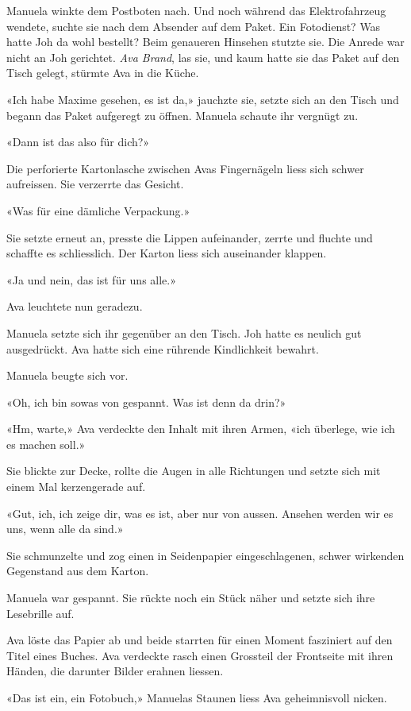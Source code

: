 Manuela winkte dem Postboten nach. Und noch während das Elektrofahrzeug
wendete, suchte sie nach dem Absender auf dem Paket. Ein Fotodienst? Was
hatte Joh da wohl bestellt? Beim genaueren Hinsehen stutzte sie. Die
Anrede war nicht an Joh gerichtet. \emph{Ava Brand}, las sie, und kaum
hatte sie das Paket auf den Tisch gelegt, stürmte Ava in die Küche.

«Ich habe Maxime gesehen, es ist da,» jauchzte sie, setzte sich an den
Tisch und begann das Paket aufgeregt zu öffnen. Manuela schaute ihr
vergnügt zu.

«Dann ist das also für dich?»

Die perforierte Kartonlasche zwischen Avas Fingernägeln liess sich
schwer aufreissen. Sie verzerrte das Gesicht.

«Was für eine dämliche Verpackung.»

Sie setzte erneut an, presste die Lippen aufeinander, zerrte und fluchte
und schaffte es schliesslich. Der Karton liess sich auseinander klappen.

«Ja und nein, das ist für uns alle.»

Ava leuchtete nun geradezu.

Manuela setzte sich ihr gegenüber an den Tisch. Joh hatte es neulich gut
ausgedrückt. Ava hatte sich eine rührende Kindlichkeit bewahrt.

Manuela beugte sich vor.

«Oh, ich bin sowas von gespannt. Was ist denn da drin?»

«Hm, warte,» Ava verdeckte den Inhalt mit ihren Armen, «ich überlege,
wie ich es machen soll.»

Sie blickte zur Decke, rollte die Augen in alle Richtungen und setzte
sich mit einem Mal kerzengerade auf.

«Gut, ich, ich zeige dir, was es ist, aber nur von aussen. Ansehen
werden wir es uns, wenn alle da sind.»

Sie schmunzelte und zog einen in Seidenpapier eingeschlagenen, schwer
wirkenden Gegenstand aus dem Karton.

Manuela war gespannt. Sie rückte noch ein Stück näher und setzte sich
ihre Lesebrille auf.

Ava löste das Papier ab und beide starrten für einen Moment fasziniert
auf den Titel eines Buches. Ava verdeckte rasch einen Grossteil der
Frontseite mit ihren Händen, die darunter Bilder erahnen liessen.

«Das ist ein, ein Fotobuch,» Manuelas Staunen liess Ava geheimnisvoll
nicken.

